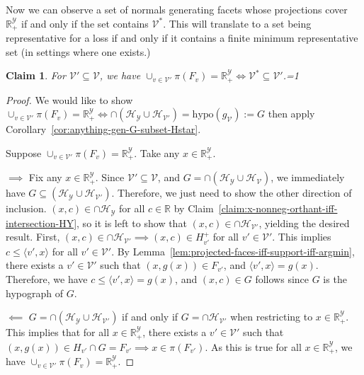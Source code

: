 \documentclass[11pt]{article}
\newcommand{\Comments}{1}
\newcommand{\mynote}[2]{\ifnum\Comments=1\textcolor{#1}{#2}\fi}
\newcommand{\mytodo}[2]{\ifnum\Comments=1%
  \todo[linecolor=#1!80!black,backgroundcolor=#1,bordercolor=#1!80!black]{#2}\fi}
\newcommand{\raf}[1]{\mynote{darkgreen}{[RF: #1]}}
\newcommand{\btw}[1]{\mytodo{gray!20!white}{BTW: #1}}%
\newcommand{\reals}{\mathbb{R}}
\renewcommand{\H}{\mathcal{H}}
\newcommand{\V}{\mathcal{V}}
\newcommand{\Y}{\mathcal{Y}}
\newcommand{\inprod}[2]{\langle #1, #2 \rangle}%
\newcommand{\relint}{\mathrm{relint}}
\newcommand{\hyp}{\mathrm{hypo}}
\newtheorem{claim}{Claim}
\begin{document}
Now we can observe a set of normals generating facets whose projections cover $\reals^\Y_+$ if and only if the set contains $\V^*$.
This will translate to a set being representative for a loss if and only if it contains a finite minimum representative set (in settings where one exists.)
\begin{claim}\label{claim:Vprime-projected-faces-cover-iff-Vstar-subset-Vprime}
	For $\V' \subseteq \V$, we have
	$\cup_{v\in\V'} \pi(F_v) = \reals^\Y_+ \iff \V^* \subseteq \V'$.\btw{Will get us to REP $\iff$ $\V^* \subseteq L(R')$ (3).}
\end{claim}
\begin{proof}
	We would like to show
	$\cup_{v\in\V'} \pi(F_v) = \reals^\Y_+ \iff \cap(\H_\Y \cup \H_{\V'}) = \hyp(g_\V) := G$ then apply Corollary~\ref{cor:anything-gen-G-subset-Hstar}.
	
	Suppose $\cup_{v\in\V'} \pi(F_v) = \reals^\Y_+$.
	Take any $x\in\reals^\Y_+$.
	
	$\implies$ 
	Fix any $x \in \reals^\Y_+$.
	Since $\V' \subseteq \V$, and $G = \cap (\H_\Y \cup \H_\V)$, we immediately have $G \subseteq (\H_\Y \cup \H_{\V'})$.
	Therefore, we just need to show the other direction of inclusion.
	$(x,c) \in \cap \H_\Y$ for all $c \in \reals$ by Claim~\ref{claim:x-nonneg-orthant-iff-intersection-HY}, so it is left to show that $(x,c) \in \cap \H_{\V'}$, yielding the desired result.
	First, $(x,c) \in \cap \H_{\V'} \implies (x,c) \in H^+_{v'}$ for all $v' \in \V'$.
	This implies $c \leq \inprod{v'}{x}$ for all $v' \in \V'$.
	By Lemma~\ref{lem:projected-faces-iff-support-iff-argmin}, there exists a $v' \in \V'$ such that $(x,g(x)) \in F_{v'}$, and $\inprod{v'}{x} = g(x)$.
	Therefore, we have $c \leq \inprod{v'}{x} = g(x)$, and $(x,c) \in G$ follows since $G$ is the hypograph of $G$.
	
	
	
	$\impliedby$
	$G = \cap (\H_\Y \cup \H_{\V'})$ if and only if $G = \cap \H_{\V'}$ when restricting to $x \in \reals_+^\Y$.
	This implies that for all $x \in \reals_+^\Y$, there exists a $v' \in \V'$ such that $(x,g(x)) \in H_{v'} \cap G = F_{v'} \implies x \in \pi(F_{v'})$.
	As this is true for all $x \in \reals_+^\Y$, we have $\cup_{v \in \V'} \pi(F_{v}) = \reals_+^\Y$.
	
\end{proof}
\end{document}
